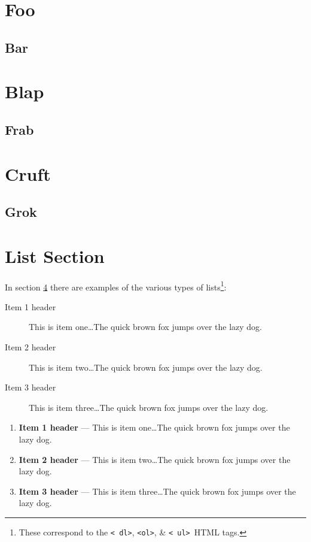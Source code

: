 \documentclass[11pt]{article}%
\begin{document}
\begin{multicols}{2}
\section{Foo}
\lipsum[1-4]
\subsection{Bar}
\lipsum[5-8]
\section{Blap}
\lipsum[1-4]
\subsection{Frab}
\lipsum[5-8]
\section{Cruft}
\lipsum[1-4]
\subsection{Grok}
\lipsum[5-8]

\section{List Section}
\label{List Section}

In section \ref{List Section} there are examples of the various
types of lists\footnote{These correspond to the {\tt \textless
dl\textgreater}, {\tt \textless ol\textgreater}, \& {\tt \textless
ul\textgreater}\ HTML tags.}:

\begin{description}
\item[Item 1 header] This is item one\dots The quick brown fox jumps
over the lazy dog.
\item[Item 2 header] This is item two\dots The quick brown fox jumps
over the lazy dog.
\item[Item 3 header] This is item three\dots The quick brown fox jumps
over the lazy dog.
\end{description}

\begin{enumerate}
\item {\bf Item 1 header} --- This is item one\dots The quick brown fox jumps
over the lazy dog.
\item {\bf Item 2 header} --- This is item two\dots The quick brown fox jumps
over the lazy dog.
\item {\bf Item 3 header} --- This is item three\dots The quick brown fox jumps
over the lazy dog.
\end{enumerate}


\end{multicols}
\end{document}
